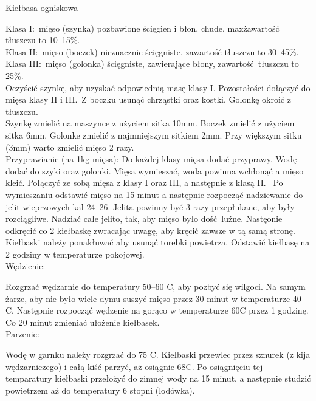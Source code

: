 \documentclass[a4paper,12pt]{article}
\begin{document}
\begin{recipe}{Kiełbasa ogniskowa}{}{}


\freeform%
Klasa I:\ mięso (szynka) pozbawione ścięgien i błon, chude, max\. zawartość tłuszczu to 10--15\%. \\
Klasa II:\ mięso (boczek) nieznacznie ścięgniste, zawartość tłuszczu to 30--45\%. \\
Klasa III:\ mięso (golonka) ścięgniste, zawierające błony, zawartość tłuszczu to 25\%.\\

Oczyścić szynkę, aby uzyskać odpowiednią masę klasy I. Pozostałości dołączyć do mięsa klasy II i III.\
Z boczku usunąć chrząstki oraz kostki. Golonkę okroić z tłuszczu.\\
Szynkę zmielić na maszynce z użyciem sitka 10mm. 
Boczek zmielić z użyciem sitka 6mm.
Golonke zmielić z najmniejszym sitkiem 2mm. Przy większym sitku (3mm) warto zmielić mięso 2 razy. \\

Przyprawianie (na 1kg mięsa):
Do każdej klasy mięsa dodać przyprawy.
Wodę dodać do szyki oraz golonki. 
Mięsa wymieszać, woda powinna wchłonąć a mięso kleić.
Połączyć ze sobą mięsa z klasy I oraz III, a następnie z klasą II.\
\freeform%
Po wymieszaniu odstawić mięso na 15 minut a następnie rozpocząć nadziewanie do jelit wieprzowych kal 24--26.
Jelita powinny być 3 razy przepłukane, aby były rozciągliwe. Nadziać całe jelito, tak, aby mięso było dość luźne.
Nastęonie odkręcić co 2 kiełbaskę zwracając uwagę, aby kręcić zawsze w tą samą stronę.
Kiełbaski należy ponakłuwać aby usunąć torebki powietrza.
Odstawić kiełbasę na 2 godziny w temperaturze pokojowej.\\

Wędzienie:

Rozgrzać wędzarnie do temperatury 50--60 \0C, aby pozbyć się wilgoci.
Na samym żarze, aby nie było wiele dymu suszyć mięso przez 30 minut w temperaturze 40 \0C.
Następnie rozpocząć wędzenie na gorąco w temperaturze 60\0C przez 1 godzinę.
Co 20 minut zmieniać ułożenie kiełbasek. \\

Parzenie:

Wodę w garnku należy rozgrzać do 75 \0C. Kiełbaski przewlec przez sznurek (z kija wędzarniczego) i całą kiść parzyć, aż osiągnie 68\0C. 
Po osiągnięciu tej temparatury kiełbaski przełożyć do zimnej wody na 15 minut, a następnie studzić powietrzem aż do temperatury 6 stopni (lodówka).


\end{recipe}
\end{document}
